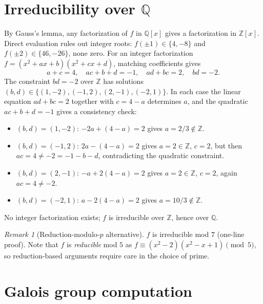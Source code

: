 \documentclass[11pt,reqno]{amsart}
\theoremstyle{plain}
\theoremstyle{definition}
\theoremstyle{remark}
\newtheorem*{remark}{Remark}
\newcommand{\Q}{\mathbb{Q}}
\newcommand{\Z}{\mathbb{Z}}
\begin{document}
\section{Irreducibility over $\Q$}
\label{sec:irreducibility}

By Gauss's lemma, any factorization of $f$ in $\Q[x]$ gives a
factorization in $\Z[x]$. Direct evaluation rules out integer roots:
$f(\pm 1) \in \{4, -8\}$ and $f(\pm 2) \in \{46, -26\}$, none zero.
For an integer factorization
$f = (x^{2} + ax + b)(x^{2} + cx + d)$, matching coefficients gives
\[
  a + c = 4,\quad ac + b + d = -1,\quad ad + bc = 2,\quad bd = -2.
\]
The constraint $bd = -2$ over $\Z$ has solutions
$(b, d) \in \{(1, -2), (-1, 2), (2, -1), (-2, 1)\}$. In each case the
linear equation $ad + bc = 2$ together with $c = 4 - a$ determines $a$,
and the quadratic $ac + b + d = -1$ gives a consistency check:
\begin{itemize}\setlength\itemsep{0pt}
\item $(b, d) = (1, -2)$: $-2a + (4 - a) = 2$ gives $a = 2/3 \notin \Z$.
\item $(b, d) = (-1, 2)$: $2a - (4 - a) = 2$ gives $a = 2 \in \Z$,
$c = 2$, but then $ac = 4 \neq -2 = -1 - b - d$, contradicting the
quadratic constraint.
\item $(b, d) = (2, -1)$: $-a + 2(4 - a) = 2$ gives $a = 2 \in \Z$,
$c = 2$, again $ac = 4 \neq -2$.
\item $(b, d) = (-2, 1)$: $a - 2(4 - a) = 2$ gives $a = 10/3 \notin \Z$.
\end{itemize}
No integer factorization exists; $f$ is irreducible over $\Z$, hence
over $\Q$.

\begin{remark}[Reduction-modulo-$p$ alternative]
$f$ is irreducible mod $7$ (one-line proof). Note that $f$ is
\emph{reducible} mod $5$ as
$f \equiv (x^{2} - 2)(x^{2} - x + 1) \pmod{5}$, so reduction-based
arguments require care in the choice of prime.
\end{remark}

\section{Galois group computation}
\label{sec:galois}
\end{document}
